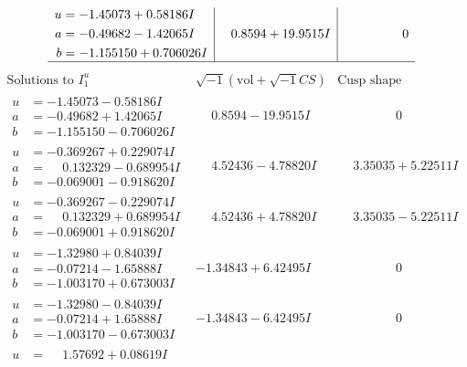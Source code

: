 \documentclass[1p]{elsarticle_modified}
\theoremstyle{definition}
\newcommand{\I}{\sqrt{-1}}
\begin{document}
$$\begin{array}{c|c|c}
\begin{aligned}
u &= -1.45073 + 0.58186 I \\
a &= -0.49682 - 1.42065 I \\
b &= -1.155150 + 0.706026 I\end{aligned}
 & \phantom{-}0.8594 + 19.9515 I & \phantom{-0.000000 } 0\\
 \hline 
 \end{array}$$\newpage$$\begin{array}{c|c|c}  
\text{Solutions to }I^u_{1}& \I (\text{vol} + \sqrt{-1}CS) & \text{Cusp shape}\\
 \hline 
\begin{aligned}
u &= -1.45073 - 0.58186 I \\
a &= -0.49682 + 1.42065 I \\
b &= -1.155150 - 0.706026 I\end{aligned}
 & \phantom{-}0.8594 - 19.9515 I & \phantom{-0.000000 } 0 \\ \hline\begin{aligned}
u &= -0.369267 + 0.229074 I \\
a &= \phantom{-}0.132329 - 0.689954 I \\
b &= -0.069001 - 0.918620 I\end{aligned}
 & \phantom{-}4.52436 - 4.78820 I & \phantom{-}3.35035 + 5.22511 I \\ \hline\begin{aligned}
u &= -0.369267 - 0.229074 I \\
a &= \phantom{-}0.132329 + 0.689954 I \\
b &= -0.069001 + 0.918620 I\end{aligned}
 & \phantom{-}4.52436 + 4.78820 I & \phantom{-}3.35035 - 5.22511 I \\ \hline\begin{aligned}
u &= -1.32980 + 0.84039 I \\
a &= -0.07214 - 1.65888 I \\
b &= -1.003170 + 0.673003 I\end{aligned}
 & -1.34843 + 6.42495 I & \phantom{-0.000000 } 0 \\ \hline\begin{aligned}
u &= -1.32980 - 0.84039 I \\
a &= -0.07214 + 1.65888 I \\
b &= -1.003170 - 0.673003 I\end{aligned}
 & -1.34843 - 6.42495 I & \phantom{-0.000000 } 0 \\ \hline\begin{aligned}
u &= \phantom{-}1.57692 + 0.08619 I \\

\end{aligned}
\end{array}$$
\end{document}
